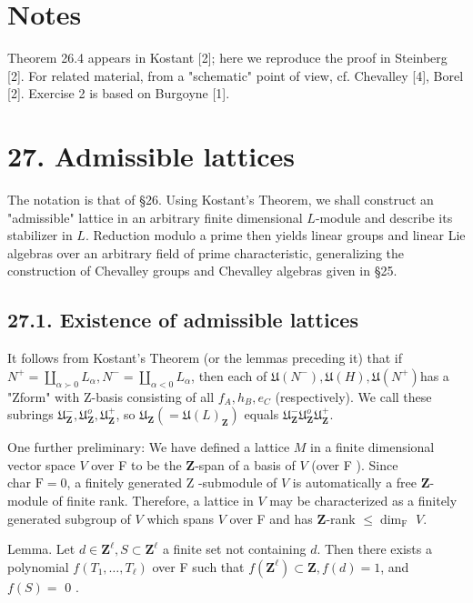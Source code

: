 \documentclass[10pt]{article}
\begin{document}
\section*{Notes}
Theorem 26.4 appears in Kostant [2]; here we reproduce the proof in Steinberg [2]. For related material, from a "schematic" point of view, cf. Chevalley [4], Borel [2]. Exercise 2 is based on Burgoyne [1].

\section*{27. Admissible lattices}
The notation is that of §26. Using Kostant's Theorem, we shall construct an "admissible" lattice in an arbitrary finite dimensional $L$-module and describe its stabilizer in $L$. Reduction modulo a prime then yields linear groups and linear Lie algebras over an arbitrary field of prime characteristic, generalizing the construction of Chevalley groups and Chevalley algebras given in §25.

\subsection*{27.1. Existence of admissible lattices}
It follows from Kostant's Theorem (or the lemmas preceding it) that if $N^{+}=\coprod_{\alpha \succ 0} L_{\alpha}, N^{-}=\coprod_{\alpha<0} L_{\alpha}$, then each of $\mathfrak{U}\left(N^{-}\right), \mathfrak{U}(H), \mathfrak{U}\left(N^{+}\right)$has a "Zform" with Z-basis consisting of all $f_{A}, h_{B}, e_{C}$ (respectively). We call these subrings $\mathfrak{U}_{\mathbf{Z}}^{-}, \mathfrak{U}_{\mathbf{Z}}^{o}, \mathfrak{U}_{\mathbf{Z}}^{+}$, so $\mathfrak{U}_{\mathbf{Z}}\left(=\mathfrak{U}(L)_{\mathbf{Z}}\right)$ equals $\mathfrak{U}_{\mathbf{Z}}^{-} \mathfrak{U}_{\mathbf{Z}}^{o} \mathfrak{U}_{\mathbf{Z}}^{+}$.

One further preliminary: We have defined a lattice $M$ in a finite dimensional vector space $V$ over F to be the $\mathbf{Z}$-span of a basis of $V$ (over F ). Since\\
char $\mathrm{F}=0$, a finitely generated Z -submodule of $V$ is automatically a free $\mathbf{Z}$-module of finite rank. Therefore, a lattice in $V$ may be characterized as a finitely generated subgroup of $V$ which spans $V$ over F and has $\mathbf{Z}$-rank $\leq \operatorname{dim}_{\mathrm{F}}$ $V$.

Lemma. Let $d \in \mathbf{Z}^{\ell}, S \subset \mathbf{Z}^{\ell}$ a finite set not containing $d$. Then there exists a polynomial $f\left(T_{1}, \ldots, T_{\ell}\right)$ over F such that $f\left(\mathbf{Z}^{\ell}\right) \subset \mathbf{Z}, f(d)=1$, and $f(S)=$ 0 .
\end{document}
